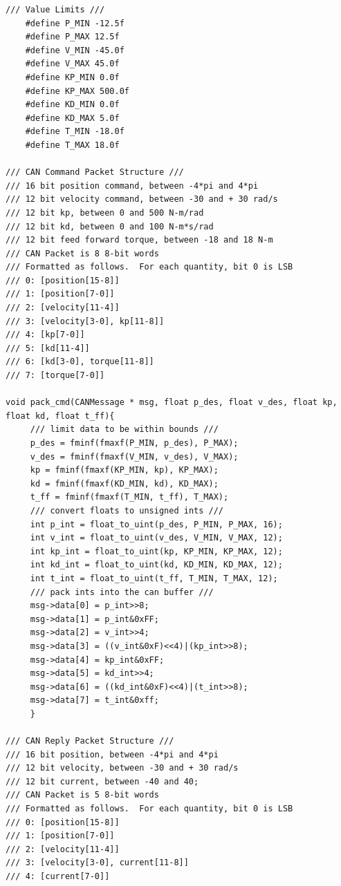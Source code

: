 \begin{lstlisting}[language=Arduino, caption= main.cpp, basicstyle=\scriptsize]
/// Value Limits ///
    #define P_MIN -12.5f
    #define P_MAX 12.5f
    #define V_MIN -45.0f
    #define V_MAX 45.0f
    #define KP_MIN 0.0f
    #define KP_MAX 500.0f
    #define KD_MIN 0.0f
    #define KD_MAX 5.0f
    #define T_MIN -18.0f
    #define T_MAX 18.0f

/// CAN Command Packet Structure ///
/// 16 bit position command, between -4*pi and 4*pi
/// 12 bit velocity command, between -30 and + 30 rad/s
/// 12 bit kp, between 0 and 500 N-m/rad
/// 12 bit kd, between 0 and 100 N-m*s/rad
/// 12 bit feed forward torque, between -18 and 18 N-m
/// CAN Packet is 8 8-bit words
/// Formatted as follows.  For each quantity, bit 0 is LSB
/// 0: [position[15-8]]
/// 1: [position[7-0]] 
/// 2: [velocity[11-4]]
/// 3: [velocity[3-0], kp[11-8]]
/// 4: [kp[7-0]]
/// 5: [kd[11-4]]
/// 6: [kd[3-0], torque[11-8]]
/// 7: [torque[7-0]]
 
void pack_cmd(CANMessage * msg, float p_des, float v_des, float kp, float kd, float t_ff){
     /// limit data to be within bounds ///
     p_des = fminf(fmaxf(P_MIN, p_des), P_MAX);                    
     v_des = fminf(fmaxf(V_MIN, v_des), V_MAX);
     kp = fminf(fmaxf(KP_MIN, kp), KP_MAX);
     kd = fminf(fmaxf(KD_MIN, kd), KD_MAX);
     t_ff = fminf(fmaxf(T_MIN, t_ff), T_MAX);
     /// convert floats to unsigned ints ///
     int p_int = float_to_uint(p_des, P_MIN, P_MAX, 16);            
     int v_int = float_to_uint(v_des, V_MIN, V_MAX, 12);
     int kp_int = float_to_uint(kp, KP_MIN, KP_MAX, 12);
     int kd_int = float_to_uint(kd, KD_MIN, KD_MAX, 12);
     int t_int = float_to_uint(t_ff, T_MIN, T_MAX, 12);
     /// pack ints into the can buffer ///
     msg->data[0] = p_int>>8;                                       
     msg->data[1] = p_int&0xFF;
     msg->data[2] = v_int>>4;
     msg->data[3] = ((v_int&0xF)<<4)|(kp_int>>8);
     msg->data[4] = kp_int&0xFF;
     msg->data[5] = kd_int>>4;
     msg->data[6] = ((kd_int&0xF)<<4)|(t_int>>8);
     msg->data[7] = t_int&0xff;
     }
      
/// CAN Reply Packet Structure ///
/// 16 bit position, between -4*pi and 4*pi
/// 12 bit velocity, between -30 and + 30 rad/s
/// 12 bit current, between -40 and 40;
/// CAN Packet is 5 8-bit words
/// Formatted as follows.  For each quantity, bit 0 is LSB
/// 0: [position[15-8]]
/// 1: [position[7-0]] 
/// 2: [velocity[11-4]]
/// 3: [velocity[3-0], current[11-8]]
/// 4: [current[7-0]]


\end{lstlisting}
